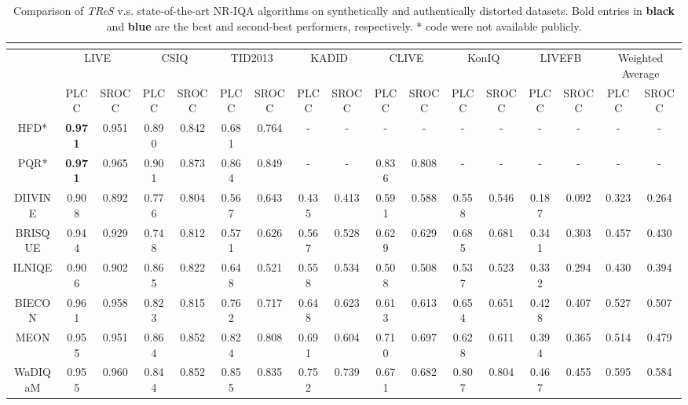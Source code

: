 \documentclass[10pt,twocolumn,letterpaper]{article}
\begin{document}
\begin{table*}[t!]
\centering
\caption{Comparison of \textit{TReS} v.s. state-of-the-art NR-IQA algorithms on synthetically and authentically distorted datasets.
Bold entries in \textbf{black} and  \textbf{\textcolor{blue1}{blue}} are the best and second-best performers, respectively. * code were not available publicly.}
\resizebox{6.8 in}{!} {


\begin{tabular}{c||cc|cc|cc|cc||cc|cc|cc||cc}
\multicolumn{1}{c}{} &  & \multicolumn{1}{c}{} &  & \multicolumn{1}{c}{} &  & \multicolumn{1}{c}{} &  & \multicolumn{1}{c}{} &  & \multicolumn{1}{c}{} &  & \multicolumn{1}{c}{} &  & \multicolumn{1}{c}{} &  & \tabularnewline
\hline 
\hline 
 & \multicolumn{2}{c|}{LIVE} & \multicolumn{2}{c|}{CSIQ} & \multicolumn{2}{c|}{TID2013} & \multicolumn{2}{c||}{KADID} & \multicolumn{2}{c|}{CLIVE} & \multicolumn{2}{c|}{KonIQ} & \multicolumn{2}{c||}{LIVEFB} & \multicolumn{2}{c}{Weighted Average}\tabularnewline
\cline{2-17} \cline{3-17} \cline{4-17} \cline{5-17} \cline{6-17} \cline{7-17} \cline{8-17} \cline{9-17} \cline{10-17} \cline{11-17} \cline{12-17} \cline{13-17} \cline{14-17} \cline{15-17} \cline{16-17} \cline{17-17} 
 & PLCC & SROCC & PLCC & SROCC & PLCC & SROCC & PLCC & SROCC & PLCC & SROCC & PLCC & SROCC & PLCC & SROCC & PLCC & SROCC\tabularnewline
\hline 
HFD{*}\cite{wu2017hierarchical} & \textbf{0.971} & 0.951 & 0.890 & 0.842 & 0.681 & 0.764 & - & - & - & - & - & - & - & - & - & -\tabularnewline
PQR{*}\cite{zeng2017probabilistic} & \textbf{0.971} & 0.965 & 0.901 & 0.873 & 0.864 & 0.849 & - & - & 0.836 & 0.808 & - & - & - & - & - & -\tabularnewline
DIIVINE\cite{saad2012blind} & 0.908 & 0.892 & 0.776 & 0.804 & 0.567 & 0.643 & 0.435 & 0.413 & 0.591 & 0.588 & 0.558 & 0.546 & 0.187 & 0.092 & 0.323 & 0.264\tabularnewline
BRISQUE\cite{mittal2012no} & 0.944 & 0.929 & 0.748 & 0.812 & 0.571 & 0.626 & 0.567 & 0.528 & 0.629 & 0.629 & 0.685 & 0.681 & 0.341 & 0.303 & 0.457 & 0.430\tabularnewline
ILNIQE\cite{zhang2015feature} & 0.906 & 0.902 & 0.865 & 0.822 & 0.648 & 0.521 & 0.558 & 0.534 & 0.508 & 0.508 & 0.537 & 0.523 & 0.332 & 0.294 & 0.430 & 0.394\tabularnewline
BIECON\cite{kim2017fully} & 0.961 & 0.958 & 0.823 & 0.815 & 0.762 & 0.717 & 0.648 & 0.623 & 0.613 & 0.613 & 0.654 & 0.651 & 0.428 & 0.407 & 0.527 & 0.507\tabularnewline
MEON\cite{ma2017end} & 0.955 & 0.951 & 0.864 & 0.852 & 0.824 & 0.808 & 0.691 & 0.604 & 0.710 & 0.697 & 0.628 & 0.611 & 0.394 & 0.365 & 0.514 & 0.479\tabularnewline
WaDIQaM\cite{bosse2017deep} & 0.955 & 0.960 & 0.844 & 0.852 & 0.855 & 0.835 & 0.752 & 0.739 & 0.671 & 0.682 & 0.807 & 0.804 & 0.467 & 0.455 & 0.595 & 0.584\tabularnewline

\end{tabular}}
\end{table*}
\end{document}
